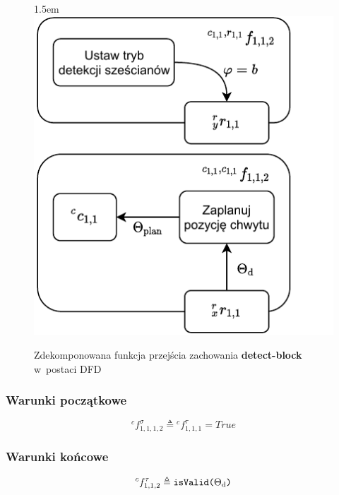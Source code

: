 \begin{figure}[ht]
    \leftskip1.5em
    \includegraphics[width=\columnwidth]{figures/ISR-cs-fp-detect-block.pdf}
    \caption{Zdekomponowana funkcja przejścia zachowania \textbf{detect-block} w~postaci DFD}
    \label{fig:cs-fp-detect-block}
\end{figure}

\subsubsection{Warunki początkowe}
\begin{equation}
    {}^{c}f^{\sigma}_{1,1,1,2} \triangleq {}^{c}f^{\tau}_{1,1,1} = True
\end{equation}

\subsubsection{Warunki końcowe}
\begin{equation}
    {}^{c}f^{\tau}_{1,1,2} \triangleq \text{\texttt{isValid($\Theta_{\mathrm{d}}$)}}
\end{equation}



